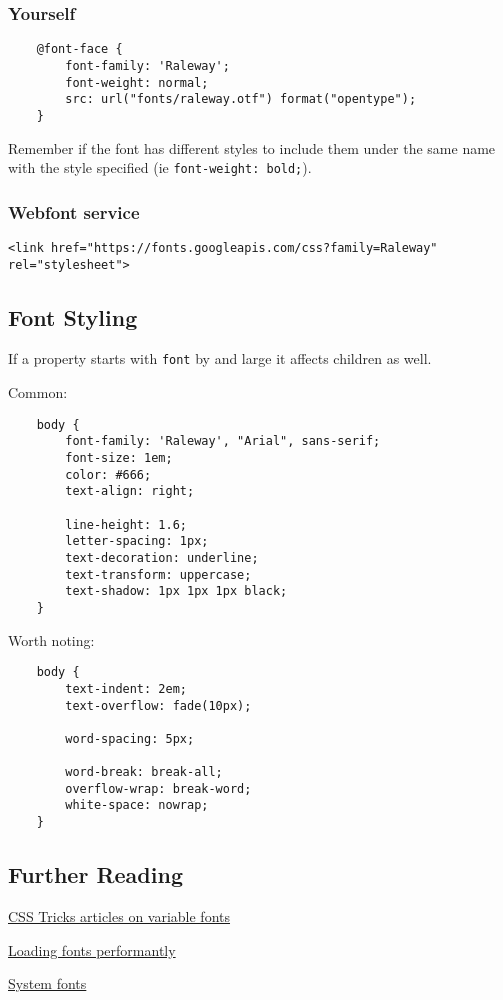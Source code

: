 \subsubsection{Yourself}

\begin{verbatim}
    @font-face {
        font-family: 'Raleway';
        font-weight: normal;
        src: url("fonts/raleway.otf") format("opentype");
    }
\end{verbatim}

Remember if the font has different styles to include them under the same name with the style specified (ie \texttt{font-weight: bold;}).

\subsubsection{Webfont service}

\begin{verbatim}
<link href="https://fonts.googleapis.com/css?family=Raleway" rel="stylesheet">
\end{verbatim}

\subsection{Font Styling}

If a property starts with \texttt{font} by and large it affects children as well.

Common:

\begin{verbatim}
    body {
        font-family: 'Raleway', "Arial", sans-serif;
        font-size: 1em;
        color: #666;
        text-align: right;

        line-height: 1.6;
        letter-spacing: 1px;
        text-decoration: underline;
        text-transform: uppercase;
        text-shadow: 1px 1px 1px black;
    }
\end{verbatim}

Worth noting:

\begin{verbatim}
    body {
        text-indent: 2em;
        text-overflow: fade(10px);

        word-spacing: 5px;

        word-break: break-all;
        overflow-wrap: break-word;
        white-space: nowrap;
    }
\end{verbatim}

\subsection{Further Reading}

\href{https://css-tricks.com/guides/opentype-variable-fonts/}{CSS Tricks articles on variable fonts}

\href{https://css-tricks.com/fout-foit-foft/}{Loading fonts performantly}

\href{https://css-tricks.com/snippets/css/system-font-stack/}{System fonts}
